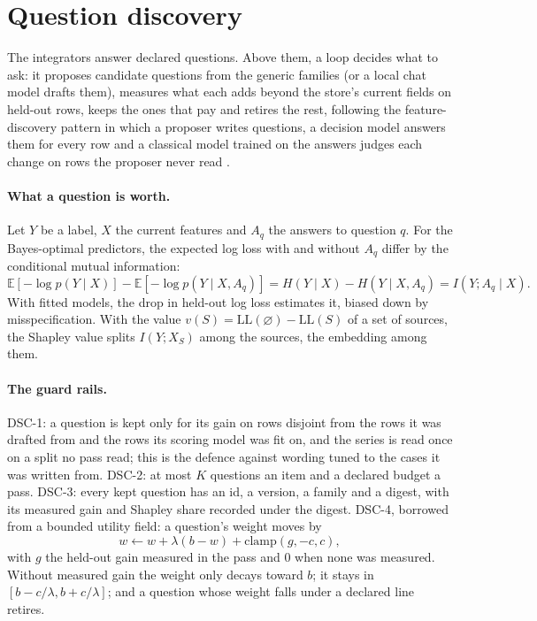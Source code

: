 \documentclass[11pt]{article}
\theoremstyle{definition}
\theoremstyle{plain}
\theoremstyle{remark}
\begin{document}
\section{Question discovery}\label{sec:discovery}
The integrators answer declared questions. Above them, a loop decides what to ask: it proposes
candidate questions from the generic families (or a local chat model drafts them), measures what
each adds beyond the store's current fields on held-out rows, keeps the ones that pay and retires
the rest, following the feature-discovery pattern in which a proposer writes questions, a decision
model answers them for every row and a classical model trained on the answers judges each change
on rows the proposer never read \citep{typesafedocs}.

\paragraph{What a question is worth.} Let $Y$ be a label, $X$ the current features and $A_q$ the
answers to question $q$. For the Bayes-optimal predictors, the expected log loss with and without
$A_q$ differ by the conditional mutual information:
\begin{equation}
\mathbb{E}[-\log p(Y \mid X)] - \mathbb{E}[-\log p(Y \mid X, A_q)] = H(Y \mid X) - H(Y \mid X, A_q)
= I(Y; A_q \mid X).
\end{equation}
With fitted models, the drop in held-out log loss estimates it, biased down by
misspecification. With the value $v(S) = \mathrm{LL}(\varnothing) - \mathrm{LL}(S)$ of a set of
sources, the Shapley value splits $I(Y; X_S)$ among the sources, the embedding among them.

\paragraph{The guard rails.} DSC-1: a question is kept only for its gain on rows disjoint from the
rows it was drafted from and the rows its scoring model was fit on, and the series is read once on
a split no pass read; this is the defence against wording tuned to the cases it was written from.
DSC-2: at most $K$ questions an item and a declared budget a pass. DSC-3: every kept question has
an id, a version, a family and a digest, with its measured gain and Shapley share recorded under
the digest. DSC-4, borrowed from a bounded utility field: a question's weight moves by
\begin{equation}
w \leftarrow w + \lambda (b - w) + \mathrm{clamp}(g, -c, c),
\end{equation}
with $g$ the held-out gain measured in the pass and $0$ when none was measured. Without measured
gain the weight only decays toward $b$; it stays in $[b - c/\lambda, b + c/\lambda]$; and a
question whose weight falls under a declared line retires.
\end{document}

